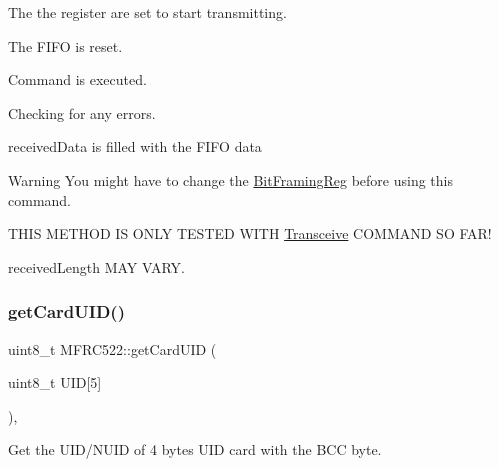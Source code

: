 \begin{DoxyEnumerate}
\item The the register are set to start transmitting. ~\newline

\item The F\+I\+FO is reset. ~\newline

\item Command is executed. ~\newline

\item Checking for any errors. ~\newline

\item received\+Data is filled with the F\+I\+FO data ~\newline
 \begin{DoxyWarning}{Warning}
You might have to change the \mbox{\hyperlink{class_m_f_r_c522_ae7ec09eb8c9c61288a4770175b4b8db7aaf8beb5a739cd8bf94b8b5c8d2d109ce}{Bit\+Framing\+Reg}} before using this command. 

T\+H\+IS M\+E\+T\+H\+OD IS O\+N\+LY T\+E\+S\+T\+ED W\+I\+TH \mbox{\hyperlink{class_m_f_r_c522_abf038692c9cf33ed59b44a612e6ed1c7a1e5adf1be49c609a5d222b5bc79606d8}{Transceive}} C\+O\+M\+M\+A\+ND SO F\+A\+R! 

received\+Length M\+AY V\+A\+RY. 
\end{DoxyWarning}

\end{DoxyEnumerate}\mbox{\label{class_m_f_r_c522_ad3c7ab4c70988e80c400f36f724a12b7}} 
\subsubsection{\texorpdfstring{get\+Card\+U\+I\+D()}{getCardUID()}}
{\footnotesize\ttfamily uint8\+\_\+t M\+F\+R\+C522\+::get\+Card\+U\+ID (\begin{DoxyParamCaption}\item[{uint8\+\_\+t}]{U\+ID\mbox{[}5\mbox{]} }\end{DoxyParamCaption})\hspace{0.3cm}{\ttfamily [override]}, {\ttfamily [virtual]}}



Get the U\+I\+D/\+N\+U\+ID of 4 bytes U\+ID card with the B\+CC byte. 


